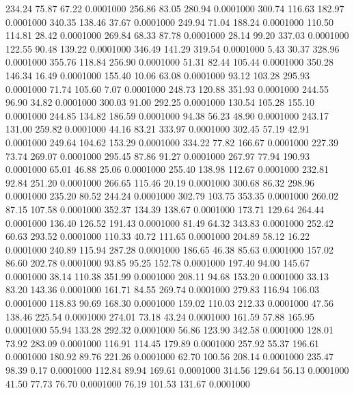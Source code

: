  234.24   75.87   67.22   0.0001000
 256.86   83.05  280.94   0.0001000
 300.74  116.63  182.97   0.0001000
 340.35  138.46   37.67   0.0001000
 249.94   71.04  188.24   0.0001000
 110.50  114.81   28.42   0.0001000
 269.84   68.33   87.78   0.0001000
  28.14   99.20  337.03   0.0001000
 122.55   90.48  139.22   0.0001000
 346.49  141.29  319.54   0.0001000
   5.43   30.37  328.96   0.0001000
 355.76  118.84  256.90   0.0001000
  51.31   82.44  105.44   0.0001000
 350.28  146.34   16.49   0.0001000
 155.40   10.06   63.08   0.0001000
  93.12  103.28  295.93   0.0001000
  71.74  105.60    7.07   0.0001000
 248.73  120.88  351.93   0.0001000
 244.55   96.90   34.82   0.0001000
 300.03   91.00  292.25   0.0001000
 130.54  105.28  155.10   0.0001000
 244.85  134.82  186.59   0.0001000
  94.38   56.23   48.90   0.0001000
 243.17  131.00  259.82   0.0001000
  44.16   83.21  333.97   0.0001000
 302.45   57.19   42.91   0.0001000
 249.64  104.62  153.29   0.0001000
 334.22   77.82  166.67   0.0001000
 227.39   73.74  269.07   0.0001000
 295.45   87.86   91.27   0.0001000
 267.97   77.94  190.93   0.0001000
  65.01   46.88   25.06   0.0001000
 255.40  138.98  112.67   0.0001000
 232.81   92.84  251.20   0.0001000
 266.65  115.46   20.19   0.0001000
 300.68   86.32  298.96   0.0001000
 235.20   80.52  244.24   0.0001000
 302.79  103.75  353.35   0.0001000
 260.02   87.15  107.58   0.0001000
 352.37  134.39  138.67   0.0001000
 173.71  129.64  264.44   0.0001000
 136.40  126.52  191.43   0.0001000
  81.49   64.32  343.83   0.0001000
 252.42   60.63  293.52   0.0001000
 110.33   40.72  111.65   0.0001000
 204.89   58.12   16.22   0.0001000
 240.89  115.94  287.28   0.0001000
 186.65   46.38   85.63   0.0001000
 157.02   86.60  202.78   0.0001000
  93.85   95.25  152.78   0.0001000
 197.40   94.00  145.67   0.0001000
  38.14  110.38  351.99   0.0001000
 208.11   94.68  153.20   0.0001000
  33.13   83.20  143.36   0.0001000
 161.71   84.55  269.74   0.0001000
 279.83  116.94  106.03   0.0001000
 118.83   90.69  168.30   0.0001000
 159.02  110.03  212.33   0.0001000
  47.56  138.46  225.54   0.0001000
 274.01   73.18   43.24   0.0001000
 161.59   57.88  165.95   0.0001000
  55.94  133.28  292.32   0.0001000
  56.86  123.90  342.58   0.0001000
 128.01   73.92  283.09   0.0001000
 116.91  114.45  179.89   0.0001000
 257.92   55.37  196.61   0.0001000
 180.92   89.76  221.26   0.0001000
  62.70  100.56  208.14   0.0001000
 235.47   98.39    0.17   0.0001000
 112.84   89.94  169.61   0.0001000
 314.56  129.64   56.13   0.0001000
  41.50   77.73   76.70   0.0001000
  76.19  101.53  131.67   0.0001000
